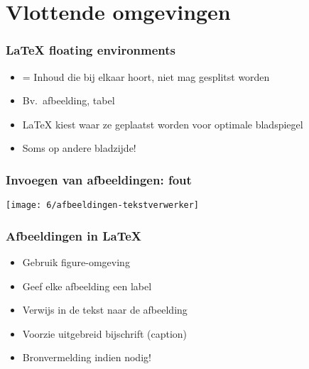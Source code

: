 \documentclass[aspectratio=169]{beamer}
\begin{document}
\section{Vlottende omgevingen}

\begin{frame}
  \frametitle{{\LaTeX} floating environments}

  \begin{itemize}
    \item = Inhoud die bij elkaar hoort, niet mag gesplitst worden
    \item Bv.\ afbeelding, tabel
    \item {\LaTeX} kiest waar ze geplaatst worden voor optimale bladspiegel
    \item Soms op andere bladzijde!
  \end{itemize}

\end{frame}

\begin{frame}
  \frametitle{Invoegen van afbeeldingen: fout}

  \centering
  \texttt{[image: 6/afbeeldingen-tekstverwerker]}

\end{frame}

\begin{frame}
  \frametitle{Afbeeldingen in {\LaTeX}}

  \begin{itemize}
    \item Gebruik figure-omgeving
    \item Geef elke afbeelding een label
    \item Verwijs in de tekst naar de afbeelding
    \item Voorzie uitgebreid bijschrift (caption)
    \item Bronvermelding indien nodig!
  \end{itemize}

\end{frame}
\end{document}
